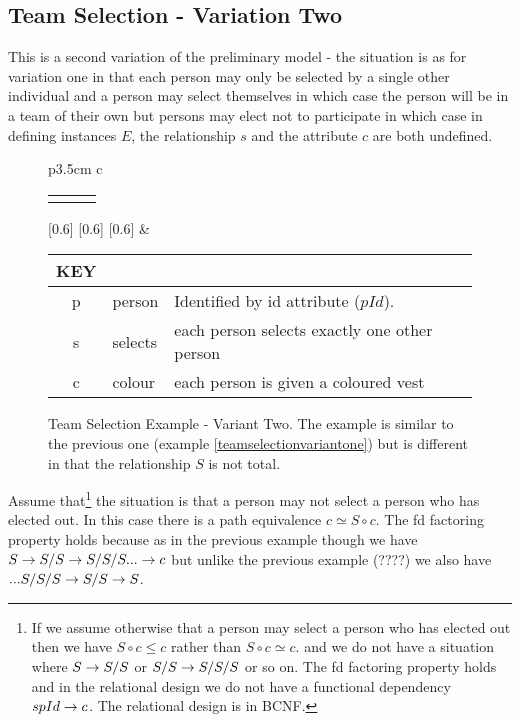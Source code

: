 \subsection{Team Selection - Variation Two}

This is a second variation of the preliminary model - the situation is as for variation one in that  each person may only be selected by a single other individual and a person may select themselves in which case the person will be in a team of their own but persons may elect not to participate in which case
in defining instances $E$, the relationship $s$ and the attribute $c$ are both undefined.

\begin{figure} [h]
\begin{center}
\begin{tabular}{p{3.5cm} c}
\begin{tabular}{c p{1.5cm} c}
   \Rnode{p}{p} & & \Rnode{v}{v}
\end{tabular}
[0.6]
[0.6]
[0.6]
\idcomp
& \footnotesize
\begin{tabular}{c p{1.5cm} p{4cm}}
KEY && \\
\hline
p & person & Identified by id attribute ($pId$). \\
s & selects & each person selects exactly one other person \\
c & colour & each person is given a coloured vest 
\end{tabular} 
\end{tabular}
\end{center}
\caption{Team Selection Example  - Variant Two. The example is similar to the previous one (example \ref{teamselectionvariantone})
but is different in that the relationship $S$ is not total.
}
\label{teamselectionvarianttwoERschema}
\end{figure}

Assume that\footnote{If we assume otherwise that a person may select a person who has elected out then we have $S \circ c \leq c$ rather than $S \circ c \simeq c$.
and we do not have a situation where $S \rightarrow S/S$ or $S/S \rightarrow S/S/S$ or so on.  The fd factoring property holds and in the relational design we do not
have a functional dependency $spId \rightarrow c$. The relational design is in BCNF.}
the situation is that a person may not select a person who has elected out. In this case there is a  path equivalence $c \simeq S \circ c$.
The fd factoring property holds because as in the previous example though we have $S \rightarrow S/S \rightarrow S/S/S ... \rightarrow c$ 
but unlike the previous example (????) we also have $... S/S/S \rightarrow S/S \rightarrow S$. 

